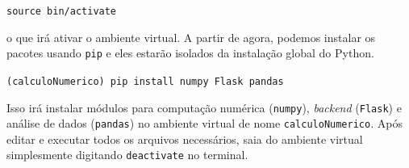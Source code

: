 \documentclass{article}
\begin{document}
	\vspace{1ex}
	\texttt{source bin/activate}
	\vspace{1ex} 

	o que irá ativar o ambiente virtual. A partir de agora, podemos instalar os pacotes usando \texttt{pip} e eles estarão
	isolados da instalação global do Python. 

	\vspace{1ex} 
	\texttt{(calculoNumerico) pip install numpy Flask pandas} 
	\vspace{1ex} 

	Isso irá instalar módulos para computação numérica (\texttt{numpy}), \textit{backend} (\texttt{Flask}) e
	análise de dados (\texttt{pandas}) no ambiente virtual de nome \texttt{calculoNumerico}. Após editar e executar todos
	os arquivos necessários, saia do ambiente virtual simplesmente digitando \texttt{deactivate} no terminal. 
\end{document}
